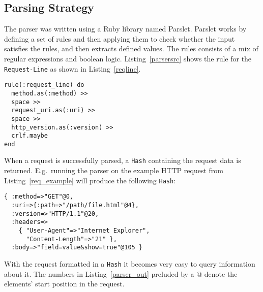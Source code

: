 \subsection{Parsing Strategy}
The parser was written using a Ruby library named Parslet. Parslet works by
defining a set of rules and then applying them to check whether the input
satisfies the rules, and then extracts defined values. The rules consists of a
mix of regular expressions and boolean logic. Listing~\ref{parsersrc} shows the rule for the \texttt{Request-Line} as shown in Listing~\ref{reqline}.

\bigskip
\begin{lstlisting}[label=parsersrc,caption=Request-Line parser rule.
(Yarn/lib/yarn/parser.rb:61)]
rule(:request_line) do 
  method.as(:method) >> 
  space >> 
  request_uri.as(:uri) >> 
  space >> 
  http_version.as(:version) >> 
  crlf.maybe 
end
\end{lstlisting}

When a request is successfully parsed, a \texttt{Hash} containing the request
data is returned. E.g.\ running the parser on the example HTTP request from
Listing~\ref{req_example} will produce the following \texttt{Hash}:

\bigskip
\begin{lstlisting}[label=parser_out,caption=Example \texttt{Parser} output]
{ :method=>"GET"@0,
  :uri=>{:path=>"/path/file.html"@4},
  :version=>"HTTP/1.1"@20,
  :headers=>
    { "User-Agent"=>"Internet Explorer",
      "Content-Length"=>"21" },
  :body=>"field=value&show=true"@105 }
\end{lstlisting}

With the request formatted in a \texttt{Hash} it becomes very easy to
query information about it. The numbers in Listing~\ref{parser_out} preluded
by a @ denote the elements' start position in the request.
